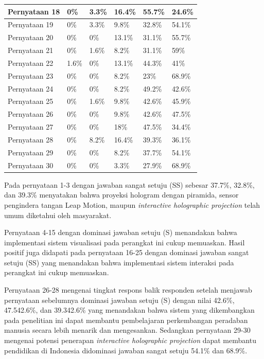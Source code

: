 \documentclass[conference]{IEEEtran}
\begin{document}
\begin{table}[h]
\begin{center}
\begin{tabular}{|l|C{0.7cm}|C{0.7cm}|C{0.7cm}|C{0.7cm}|C{0.7cm}|}
				Pernyataan 18 & 0\%	 & 3.3\%  & 16.4\% & 55.7\% & 24.6\% \\ \hline
				Pernyataan 19 & 0\%    & 3.3\%  & 9.8\%  & 32.8\% & 54.1\% \\ \hline
				Pernyataan 20 & 0\%    & 0\% 	  & 13.1\% & 31.1\% & 55.7\% \\ \hline
				Pernyataan 21 & 0\%    & 1.6\%  & 8.2\%  & 31.1\% & 59\%   \\ \hline
				Pernyataan 22 & 1.6\%  & 0\%    & 13.1\% & 44.3\% & 41\%   \\ \hline
				Pernyataan 23 & 0\%    & 0\%	  & 8.2\%  &  23\%  & 68.9\% \\ \hline
				Pernyataan 24 & 0\%    & 0\%    & 8.2\%  & 49.2\% & 42.6\% \\ \hline
				Pernyataan 25 & 0\%    & 1.6\%  & 9.8\%  & 42.6\% & 45.9\% \\ \hline
				Pernyataan 26 & 0\%	 & 0\%    & 9.8\%  & 42.6\% & 47.5\% \\ \hline
				Pernyataan 27 & 0\%    & 0\%    & 18\%   & 47.5\% & 34.4\% \\ \hline
				Pernyataan 28 & 0\%    & 8.2\%  & 16.4\% & 39.3\% & 36.1\% \\ \hline
				Pernyataan 29 & 0\% 	 & 0\%    & 8.2\%  & 37.7\% & 54.1\% \\ \hline
				Pernyataan 30 & 0\%	 & 0\%    & 3.3\%  & 27.9\% & 68.9\% \\ \hline
				\end{tabular}
				\end{center}
			\end{table}
			\vspace{-2ex}
			
			Pada pernyataan 1-3 dengan jawaban sangat setuju (SS) sebesar 37.7\%, 32.8\%, dan 39.3\% menyatakan bahwa proyeksi hologram dengan piramida, sensor pengindera tangan Leap Motion, maupun \textit{interactive holographic projection} telah umum diketahui oleh masyarakat.
			
			Pernyataan 4-15 dengan dominasi jawaban setuju (S) menandakan bahwa implementasi sistem visualisasi pada perangkat ini cukup memuaskan. Hasil positif juga didapati pada pernyataan 16-25 dengan dominasi jawaban sangat setuju (SS) yang menandakan bahwa implementasi sistem interaksi pada perangkat ini cukup memuaskan.
			
			Pernyataan 26-28 mengenai tingkat respons balik responden setelah menjawab pernyataan sebelumnya dominasi jawaban setuju (S) dengan nilai 42.6\%, 47.542.6\%, dan 39.342.6\% yang menandakan bahwa sistem yang dikembangkan pada penelitian ini dapat membantu pembelajaran perkembangan peradaban manusia secara lebih menarik dan mengesankan. Sedangkan pernyataan 29-30 mengenai potensi penerapan \textit{interactive holographic projection} dapat membantu pendidikan di Indonesia didominasi jawaban sangat setuju 54.1\% dan 68.9\%.
			
\end{document}
